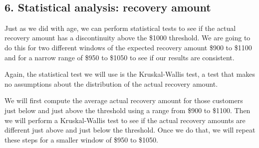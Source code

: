 \documentclass[11pt]{article}
\begin{document}
    \begin{center}
    \end{center}
    { \hspace*{\fill} \\}
    
    \subsection{6. Statistical analysis: recovery
amount}\label{statistical-analysis-recovery-amount}

Just as we did with age, we can perform statistical tests to see if the
actual recovery amount has a discontinuity above the \$1000 threshold.
We are going to do this for two different windows of the expected
recovery amount \$900 to \$1100 and for a narrow range of \$950 to
\$1050 to see if our results are consistent.

Again, the statistical test we will use is the Kruskal-Wallis test, a
test that makes no assumptions about the distribution of the actual
recovery amount.

We will first compute the average actual recovery amount for those
customers just below and just above the threshold using a range from
\$900 to \$1100. Then we will perform a Kruskal-Wallis test to see if
the actual recovery amounts are different just above and just below the
threshold. Once we do that, we will repeat these steps for a smaller
window of \$950 to \$1050.
\end{document}
